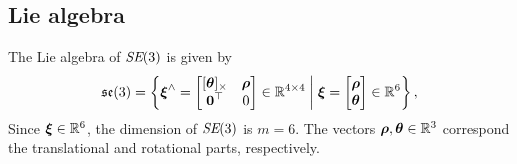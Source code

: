 \subsection{Lie algebra}
The Lie algebra of $\textit{SE}(3)$ is given by
\begin{equation}
  {\mathfrak {se}}(3) = \left \{ {\boldsymbol{\mathbf{\xi}}}^\wedge = 
  \begin{bmatrix}
    [{\boldsymbol{\mathbf{\theta}}}]_\times & {\boldsymbol{\mathbf{\rho}}}\\
    \boldsymbol{\mathbf{0}}^{\top} & 0
  \end{bmatrix}
  \in {\mathbb R}^{4 \times 4} \;\middle|\; {\boldsymbol{\mathbf{\xi}}} =
  \begin{bmatrix}
    {\boldsymbol{\mathbf{\rho}}}\\
    {\boldsymbol{\mathbf{\theta}}}
  \end{bmatrix}  
  \in {\mathbb R}^6 \right \},
\end{equation}
Since ${\boldsymbol{\mathbf{\xi}}} \in {\mathbb R}^6$, the dimension of $\textit{SE}(3)$ is $m = 6$.
The vectors ${\boldsymbol{\mathbf{\rho}}}, {\boldsymbol{\mathbf{\theta}}} \in {\mathbb R}^3$ correspond the translational and rotational parts, respectively.

